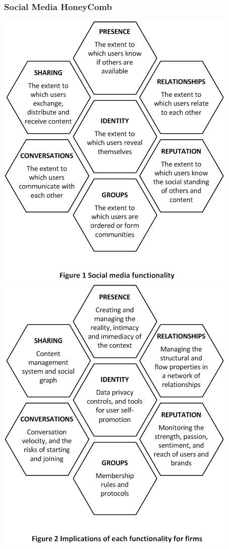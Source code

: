 \documentclass{article} %
\begin{document}
	\subsubsection{Social Media HoneyComb}
	\begin{center}
	\includegraphics[scale=0.5]{img/SMHC_functionality.jpg}
	\includegraphics[scale=0.5]{img/SMHC_implications.jpg}
	\end{center}
\end{document}
